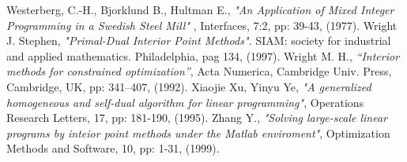 \documentclass[a4paper,10 pt,titlepage,twoside]{book}
\theoremstyle{plain}
\theoremstyle{definition}
\theoremstyle{remark}
\begin{document}
\begin{thebibliography}{9}

 Westerberg, C.-H., Bjorklund B., Hultman E., \emph{"An Application of Mixed Integer Programming in a Swedish Steel Mill" }, Interfaces, 7:2, pp: 39-43, (1977).
 Wright J. Stephen, \emph{\;"Primal-Dual Interior Point Methods".} SIAM: society for industrial and applied mathematics. Philadelphia, pag 134, (1997).
Wright M. H.,\textit{ “Interior methods for constrained optimization”}, Acta Numerica, Cambridge Univ. Press, Cambridge, UK, pp: 341–407, (1992).
Xiaojie Xu, Yinyu Ye, \emph{"A generalized homogeneous and self-dual algorithm for linear programming"}, Operations Research Letters, 17, pp: 181-190, (1995).
Zhang Y.,\textit{ "Solving large-scale linear programs by inteior point methods under
the Matlab enviroment"}, Optimization Methods and Software, 10, pp: 1-31, (1999).
\end{thebibliography}
\end{document}
